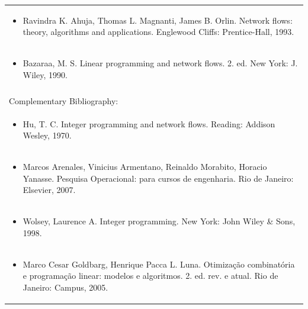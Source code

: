 \documentclass[11pt]{article}
\begin{document}
\begin{center}
\begin{longtable}{|p{4cm}|p{4cm}|p{4cm}|p{4cm}|}
\multicolumn{4}{|p{\dimexpr 16cm + 6\tabcolsep\relax}|}{\begin{itemize}\item Ravindra K. Ahuja, Thomas L. Magnanti, James B. Orlin. Network flows: theory, algorithms and applications. Englewood Cliffs: Prentice-Hall, 1993.\end{itemize}}\\
\multicolumn{4}{|p{\dimexpr 16cm + 6\tabcolsep\relax}|}{\begin{itemize}\item Bazaraa, M. S. Linear programming and network flows. 2. ed. New York: J. Wiley, 1990.\end{itemize}}\\
\multicolumn{4}{|p{16cm}|}{}\\
\hline
\multicolumn{4}{|p{16cm}|}{Complementary Bibliography:}\\*
\multicolumn{4}{|p{\dimexpr 16cm + 6\tabcolsep\relax}|}{\begin{itemize}\item Hu, T. C. Integer programming and network flows. Reading: Addison Wesley, 1970.\end{itemize}}\\
\multicolumn{4}{|p{\dimexpr 16cm + 6\tabcolsep\relax}|}{\begin{itemize}\item Marcos Arenales, Vinicius Armentano, Reinaldo Morabito, Horacio Yanasse. Pesquisa Operacional: para cursos de engenharia. Rio de Janeiro: Elsevier, 2007.\end{itemize}}\\
\multicolumn{4}{|p{\dimexpr 16cm + 6\tabcolsep\relax}|}{\begin{itemize}\item Wolsey, Laurence A. Integer programming. New York: John Wiley \& Sons, 1998.\end{itemize}}\\
\multicolumn{4}{|p{\dimexpr 16cm + 6\tabcolsep\relax}|}{\begin{itemize}\item Marco Cesar Goldbarg, Henrique Pacca L. Luna. Otimização combinatória e programação linear: modelos e algoritmos. 2. ed. rev. e atual. Rio de Janeiro: Campus, 2005.\end{itemize}}\\
\hline
\end{longtable}
\end{center}
\end{document}
